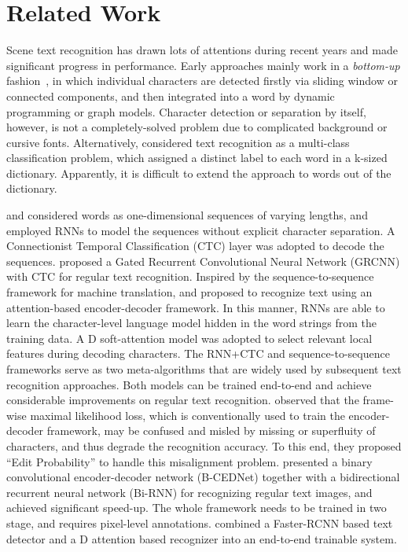 \documentclass[letterpaper]{article} \usepackage{aaai19}  \usepackage{times}  \usepackage{helvet}  \usepackage{courier}  \usepackage{url}  \usepackage{graphicx}  \usepackage{amsmath}
\begin{document}
\section{Related Work}
\label{sec:ReWork}
Scene text recognition has drawn lots of attentions during recent years and made significant progress in performance.
Early approaches mainly work in a \textit{bottom-up} fashion~\cite{Wangkai2011,MishraCVPR2012,SVTP,YaoCVPR2014}, in which individual characters are detected firstly via sliding window or connected components, and then integrated into a word by dynamic programming or graph models. Character detection or separation by itself, however, is not a completely-solved problem due to complicated background or cursive fonts.
Alternatively, \cite{Max2016IJCV} considered text recognition as a multi-class classification problem, which assigned a distinct label to each word in a k-sized dictionary. Apparently, it is difficult to extend the approach to words out of the dictionary.

\cite{He2015Reading} and \cite{ShiBY15} considered words as one-dimensional sequences of varying lengths,
and employed RNNs to model the sequences without explicit character separation.
A Connectionist Temporal Classification (CTC) layer was adopted to decode the sequences.
\cite{OCRNIPS17} proposed a Gated Recurrent Convolutional Neural Network (GRCNN) with CTC for regular text recognition.
Inspired by the sequence-to-sequence framework for machine translation, \cite{Lee_2016_CVPR} and \cite{shiCVPR2016} proposed to recognize text using an attention-based encoder-decoder framework. In this manner, RNNs are able to learn the character-level language model hidden in the word strings from the training data. A D soft-attention model was adopted to select relevant local features during decoding characters.
The RNN+CTC and sequence-to-sequence frameworks serve as two meta-algorithms that are widely used by subsequent text recognition approaches.
Both models can be trained end-to-end and achieve considerable improvements on regular text recognition.
\cite{cheng_EditDistance} observed that the frame-wise maximal likelihood loss, which is conventionally used to train the encoder-decoder framework, may be
confused and misled by missing or superfluity of characters, and thus degrade the recognition accuracy.
To this end, they proposed ``Edit Probability'' to handle this misalignment problem.
\cite{SqueezeText18} presented a binary convolutional encoder-decoder network (B-CEDNet) together with a bidirectional recurrent neural network (Bi-RNN) for recognizing regular text images, and achieved significant speed-up.
The whole framework needs to be trained in two stage, and requires pixel-level annotations.
\cite{li2017towards} combined a Faster-RCNN based text detector and a D attention based recognizer into an end-to-end trainable system.
\end{document}
